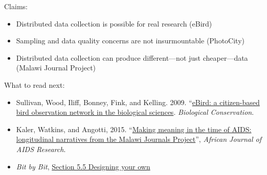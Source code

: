 \documentclass[aspectratio=169]{beamer}
\begin{document}
\begin{frame}

Claims:
\begin{itemize}
\item Distributed data collection is possible for real research (eBird)
\pause
\item Sampling and data quality concerns are not insurmountable (PhotoCity)
\pause
\item Distributed data collection can produce different---not just cheaper---data (Malawi Journal Project)
\end{itemize}
 
\end{frame}
\begin{frame}

What to read next:
\begin{itemize}
\item Sullivan, Wood, Iliff, Bonney, Fink, and Kelling. 2009. ``\href{https://doi.org/10.1016/j.biocon.2009.05.006}{eBird: a citizen-based bird observation network in the biological sciences}. \textit{Biological Conservation}.
\item Kaler, Watkins, and Angotti, 2015. ``\href{https://doi.org/10.2989/16085906.2015.1084342}{Making meaning in the time of AIDS: longitudinal narratives from the Malawi Journals Project}'', \textit{African Journal of AIDS Research}.
\item \textit{Bit by Bit}, \href{https://www.bitbybitbook.com/en/1st-ed/creating-mass-collaboration/design/}{Section 5.5 Designing your own}
\end{itemize}

\end{frame}
\frame{\titlepage}
\end{document}
